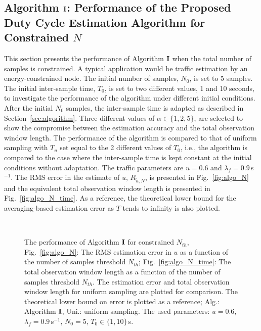 \documentclass[11pt,draftclsnofoot,journal,onecolumn]{IEEEtran}
\begin{document}
\subsection{Algorithm $\bf{I}$: Performance of the Proposed Duty Cycle Estimation Algorithm for Constrained $N$}
\label{sec:algorithm_numerical_cons_N}

This section presents the performance of Algorithm $\bf{I}$ when the total number of samples is constrained. A typical application would be traffic estimation by an energy-constrained node. The initial number of samples, $N_0$, is set to 5 samples. The initial inter-sample time, $T_0$, is set to two different values, 1 and 10 seconds, to investigate the performance of the algorithm under different initial conditions. After the initial $N_0$ samples, the inter-sample time is adapted as described in Section~\ref{sec:algorithm}. Three different values of $\alpha\in\{1,2,5\}$, are selected to show the compromise between the estimation accuracy and the total observation window length. The performance of the algorithm is compared to that of uniform sampling with $T_u$ set equal to the 2 different values of $T_0$, i.e., the algorithm is compared to the case where the inter-sample time is kept constant at the initial conditions without adaptation. The traffic parameters are $u=0.6$ and $\lambda_f=0.9$\,s$^{-1}$. The RMS error in the estimate of $u$, $R_{\tilde{u},N}$, is presented in Fig.~\ref{fig:algo_N} and the equivalent total observation window length is presented in Fig.~\ref{fig:algo_N_time}. As a reference, the theoretical lower bound for the averaging-based estimation error as $T$ tends to infinity is also plotted. 
\begin{figure}
\centering
{}\\
\caption{The performance of Algorithm $\bf{I}$ for constrained $N_{th}$, Fig.~\ref{fig:algo_N}: The RMS estimation error in $u$ as a function of the number of samples threshold $N_{th}$; Fig.~\ref{fig:algo_N_time}: The total observation window length as a function of the number of samples threshold $N_{th}$. The estimation error and total observation window length for uniform sampling are plotted for comparison. The theoretical lower bound on error is plotted as a reference; Alg.: Algorithm $\bf{I}$, Uni.: uniform sampling. The used parameters: $u=0.6$, $\lambda_f=0.9$\,s$^{-1}$, $N_0=5$, $T_0\in\{1,10\}$\,s.}
\end{figure}
\end{document}
